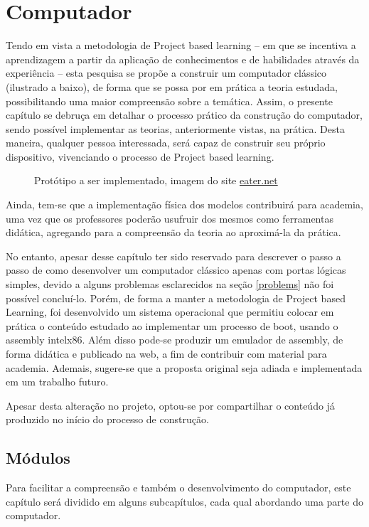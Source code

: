 \section{Computador} 
\label{computer}
Tendo em vista a metodologia de Project based learning – em que se incentiva a aprendizagem a partir da aplicação de conhecimentos e de habilidades através da experiência – esta pesquisa se propõe a construir um computador clássico (ilustrado a baixo), de forma que se possa por em prática a teoria estudada, possibilitando uma maior compreensão sobre a temática. Assim, o presente capítulo se debruça em detalhar o processo prático da construção do computador, sendo possível implementar as teorias, anteriormente vistas, na prática. Desta maneira, qualquer pessoa interessada, será capaz de construir seu próprio dispositivo, vivenciando o processo de Project based learning. 

\vspace{1cm}
\begin{figure}[H] \centering 
  \caption{\label{breadboard_computer} Protótipo a ser implementado, imagem do site \href{https://eater.net/}{eater.net}} 
\end{figure}

Ainda, tem-se que a implementação física dos modelos contribuirá para academia, uma vez que os professores poderão usufruir dos mesmos como ferramentas didática, agregando para a compreensão da teoria ao aproximá-la da prática. 

No entanto, apesar desse capítulo ter sido reservado para descrever o passo a passo de como desenvolver um computador clássico apenas com portas lógicas simples, devido a alguns problemas esclarecidos na seção \ref{problems} não foi possível concluí-lo. Porém, de forma a manter a metodologia de Project based Learning, foi desenvolvido um sistema operacional que permitiu colocar em prática o conteúdo estudado ao implementar um processo de boot, usando o assembly intelx86. Além disso pode-se produzir um emulador de assembly, de forma didática e publicado na web,  a fim de contribuir com material para academia. Ademais, sugere-se que a proposta original seja adiada e implementada em um trabalho futuro. 

Apesar desta alteração no projeto, optou-se por compartilhar o conteúdo já produzido no início do processo de construção. 

\subsection{Módulos}
Para facilitar a compreensão e também o desenvolvimento do computador, este capítulo será dividido em alguns subcapítulos, cada qual abordando uma parte do computador.


